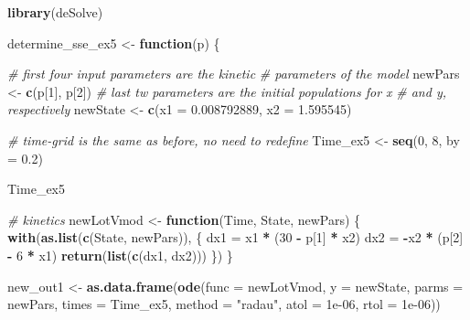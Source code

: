 \documentclass[
]{article}
\newenvironment{Shaded}{\begin{snugshade}}{\end{snugshade}}
\newcommand{\AttributeTok}[1]{\textcolor[rgb]{0.13,0.29,0.53}{#1}}
\newcommand{\CommentTok}[1]{\textcolor[rgb]{0.56,0.35,0.01}{\textit{#1}}}
\newcommand{\ControlFlowTok}[1]{\textcolor[rgb]{0.13,0.29,0.53}{\textbf{#1}}}
\newcommand{\DecValTok}[1]{\textcolor[rgb]{0.00,0.00,0.81}{#1}}
\newcommand{\FloatTok}[1]{\textcolor[rgb]{0.00,0.00,0.81}{#1}}
\newcommand{\FunctionTok}[1]{\textcolor[rgb]{0.13,0.29,0.53}{\textbf{#1}}}
\newcommand{\NormalTok}[1]{#1}
\newcommand{\OtherTok}[1]{\textcolor[rgb]{0.56,0.35,0.01}{#1}}
\newcommand{\SpecialCharTok}[1]{\textcolor[rgb]{0.81,0.36,0.00}{\textbf{#1}}}
\newcommand{\StringTok}[1]{\textcolor[rgb]{0.31,0.60,0.02}{#1}}
\begin{document}
\begin{Shaded}
\begin{Highlighting}[]
\FunctionTok{library}\NormalTok{(deSolve)}

\NormalTok{determine\_sse\_ex5 }\OtherTok{\textless{}{-}} \ControlFlowTok{function}\NormalTok{(p) \{}

    \CommentTok{\# first four input parameters are the kinetic}
    \CommentTok{\# parameters of the model}
\NormalTok{    newPars }\OtherTok{\textless{}{-}} \FunctionTok{c}\NormalTok{(p[}\DecValTok{1}\NormalTok{], p[}\DecValTok{2}\NormalTok{])}
    \CommentTok{\# last tw parameters are the initial populations for x}
    \CommentTok{\# and y, respectively}
\NormalTok{    newState }\OtherTok{\textless{}{-}} \FunctionTok{c}\NormalTok{(}\AttributeTok{x1 =} \FloatTok{0.008792889}\NormalTok{, }\AttributeTok{x2 =} \FloatTok{1.595545}\NormalTok{)}

    \CommentTok{\# time{-}grid is the same as before, no need to redefine}
\NormalTok{    Time\_ex5 }\OtherTok{\textless{}{-}} \FunctionTok{seq}\NormalTok{(}\DecValTok{0}\NormalTok{, }\DecValTok{8}\NormalTok{, }\AttributeTok{by =} \FloatTok{0.2}\NormalTok{)}

\NormalTok{    Time\_ex5}

    \CommentTok{\# kinetics}
\NormalTok{    newLotVmod }\OtherTok{\textless{}{-}} \ControlFlowTok{function}\NormalTok{(Time, State, newPars) \{}
        \FunctionTok{with}\NormalTok{(}\FunctionTok{as.list}\NormalTok{(}\FunctionTok{c}\NormalTok{(State, newPars)), \{}
\NormalTok{            dx1 }\OtherTok{=}\NormalTok{ x1 }\SpecialCharTok{*}\NormalTok{ (}\DecValTok{30} \SpecialCharTok{{-}}\NormalTok{ p[}\DecValTok{1}\NormalTok{] }\SpecialCharTok{*}\NormalTok{ x2)}
\NormalTok{            dx2 }\OtherTok{=} \SpecialCharTok{{-}}\NormalTok{x2 }\SpecialCharTok{*}\NormalTok{ (p[}\DecValTok{2}\NormalTok{] }\SpecialCharTok{{-}} \DecValTok{6} \SpecialCharTok{*}\NormalTok{ x1)}
            \FunctionTok{return}\NormalTok{(}\FunctionTok{list}\NormalTok{(}\FunctionTok{c}\NormalTok{(dx1, dx2)))}
\NormalTok{        \})}
\NormalTok{    \}}

\NormalTok{    new\_out1 }\OtherTok{\textless{}{-}} \FunctionTok{as.data.frame}\NormalTok{(}\FunctionTok{ode}\NormalTok{(}\AttributeTok{func =}\NormalTok{ newLotVmod, }\AttributeTok{y =}\NormalTok{ newState,}
        \AttributeTok{parms =}\NormalTok{ newPars, }\AttributeTok{times =}\NormalTok{ Time\_ex5, }\AttributeTok{method =} \StringTok{"radau"}\NormalTok{,}
        \AttributeTok{atol =} \FloatTok{1e{-}06}\NormalTok{, }\AttributeTok{rtol =} \FloatTok{1e{-}06}\NormalTok{))}


\end{Highlighting}
\end{Shaded}
\end{document}
